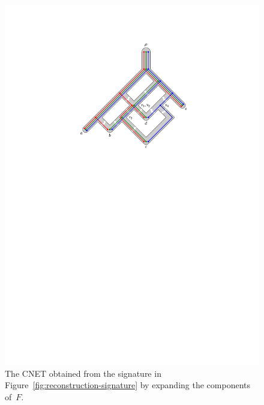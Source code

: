 \begin{figure}
  \centering
  \includegraphics{../figs/ch4/reconstruction-output-network}
  \caption{The CNET obtained from the signature in
    Figure~\ref{fig:reconstruction-signature} by expanding the components
    of~$F$.}
  \label{fig:reconstruction-output}
\end{figure}

